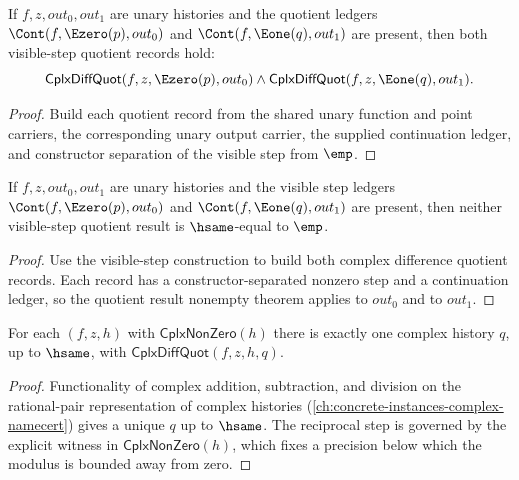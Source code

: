 \begin{theorem}
\label{thm:cplx-diff-quot-visible-step-construct}
If \(f,z,out_0,out_1\) are unary histories and the quotient ledgers
\(\Cont(f,\Ezero(p),out_0)\) and \(\Cont(f,\Eone(q),out_1)\) are present, then
both visible-step quotient records hold:
$$
\mathsf{CplxDiffQuot}(f,z,\Ezero(p),out_0)
\land
\mathsf{CplxDiffQuot}(f,z,\Eone(q),out_1).
$$
\end{theorem}
\begin{proof}
Build each quotient record from the shared unary function and point carriers,
the corresponding unary output carrier, the supplied continuation ledger, and
constructor separation of the visible step from \(\emp\).
\end{proof}

\begin{theorem}
\label{thm:cplx-diff-quot-visible-step-results-nonempty}
If $f,z,out_0,out_1$ are unary histories and the visible step ledgers
$\Cont(f,\Ezero(p),out_0)$ and $\Cont(f,\Eone(q),out_1)$ are present, then
neither visible-step quotient result is $\hsame$-equal to $\emp$.
\end{theorem}
\begin{proof}
Use the visible-step construction to build both complex difference quotient
records. Each record has a constructor-separated nonzero step and a
continuation ledger, so the quotient result nonempty theorem applies to
$out_0$ and to $out_1$.
\end{proof}

\begin{lemma}
\label{lem:cplx-diff-quot-well-defined}
For each \((f, z, h)\) with \(\mathsf{CplxNonZero}(h)\) there is exactly one complex history \(q\), up to \(\hsame\), with \(\mathsf{CplxDiffQuot}(f, z, h, q)\).
\end{lemma}
\begin{proof}
Functionality of complex addition, subtraction, and division on the rational-pair representation of complex histories (\autoref{ch:concrete-instances-complex-namecert}) gives a unique \(q\) up to \(\hsame\). The reciprocal step is governed by the explicit witness in \(\mathsf{CplxNonZero}(h)\), which fixes a precision below which the modulus is bounded away from zero.
\end{proof}

